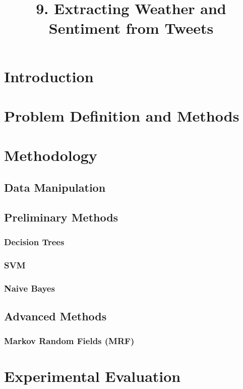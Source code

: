\documentclass[a4paper,11pt]{article}
\title{9. Extracting Weather and Sentiment from Tweets}
\begin{document}
       \maketitle

\section{Introduction}



\section{Problem Definition and Methods}


\section{Methodology}
\subsection{Data Manipulation}


\subsection{Preliminary Methods}
\subsubsection{Decision Trees}


\subsubsection{SVM}


\subsubsection{Naive Bayes}


\subsection{Advanced Methods}
\subsubsection{Markov Random Fields (MRF)}


\section{Experimental Evaluation}
\end{document}
